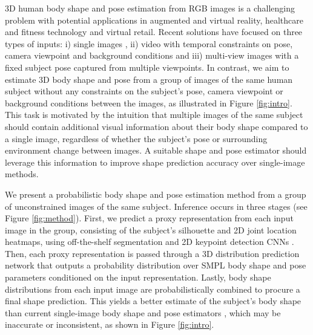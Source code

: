 \documentclass[final]{cvpr}
\begin{document}
3D human body shape and pose estimation from RGB images is a challenging problem with potential applications in augmented and virtual reality, healthcare and fitness technology and virtual retail. Recent solutions have focused on three types of inputs: i) single images \cite{Bogo:ECCV:2016, tan2017,hmrKanazawa17,kolotouros2019spin,kolotouros2019cmr,zhang2019danet,Moon_2020_ECCV_I2L-MeshNet,STRAPS2020BMVC,omran2018nbf,pavlakos2018humanshape,varol18_bodynet}, ii) video \cite{kocabas2019vibe,humanMotionKanazawa19,sun2019dsd-satn, pavlakos2019texturepose, MuVS:3DV:2017} with temporal constraints on pose, camera viewpoint and background conditions and iii) multi-view images \cite{liang2019samv,smith20193dfromsilhouettes} with a fixed subject pose captured from multiple viewpoints. In contrast, we aim to estimate 3D body shape and pose from a group of images of the same human subject without any constraints on the subject's pose, camera viewpoint or background conditions between the images, as illustrated in Figure \ref{fig:intro}. This task is motivated by the intuition that multiple images of the same subject should contain additional visual information about their body shape compared to a single image, regardless of whether the subject's pose or surrounding environment change between images. A suitable shape and pose estimator should leverage this information to improve shape prediction accuracy over single-image methods.

We present a probabilistic body shape and pose estimation method from a group of unconstrained images of the same subject. Inference occurs in three stages (see Figure \ref{fig:method}). First, we predict a proxy representation from each input image in the group, consisting of the subject's silhouette and 2D joint location heatmaps, using off-the-shelf segmentation and 2D keypoint detection CNNs \cite{he2017maskrcnn, Guler2018DensePose, kirillov2019pointrend, wu2019detectron2}. Then, each proxy representation is passed through a 3D distribution prediction network that outputs a probability distribution over SMPL \cite{SMPL:2015} body shape and pose parameters conditioned on the input representation. Lastly, body shape distributions from each input image are probabilistically combined to procure a final shape prediction. This yields a better estimate of the subject's body shape than current single-image body shape and pose estimators \cite{hmrKanazawa17,kolotouros2019spin,kolotouros2019cmr,zhang2019danet,STRAPS2020BMVC}, which may be inaccurate or inconsistent, as shown in Figure \ref{fig:intro}.
\end{document}
